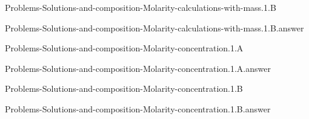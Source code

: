 \documentclass[main.tex]{subfiles}
\newcommand\chapterlabel{}
\begin{document}
\renewcommand\chapterlabel{Ch-electrolytes}
\begin{question}[ID=\the\value{numA}]
{Problems-Solutions-and-composition-Molarity-calculations-with-mass.1.B}
\end{question}
   \begin{Form}
   \TextField[multiline,backgroundcolor=gray!20,borderwidth=0,width=0.43\textwidth  ,height=115pt, name=\the\value{numA}]  { }\end{Form}
\begin{solution}
{Problems-Solutions-and-composition-Molarity-calculations-with-mass.1.B.answer}
\hspace{0.1cm}
\end{solution}


\renewcommand\chapterlabel{Ch-electrolytes}
\begin{question}[ID=\the\value{numA}]
{Problems-Solutions-and-composition-Molarity-concentration.1.A}
\end{question}
   \begin{Form}
   \TextField[multiline,backgroundcolor=gray!20,borderwidth=0,width=0.43\textwidth  ,height=115pt, name=\the\value{numA}]  { }\end{Form}
\begin{solution}
{Problems-Solutions-and-composition-Molarity-concentration.1.A.answer}
\hspace{0.1cm}
\end{solution}


\renewcommand\chapterlabel{Ch-electrolytes}
\begin{question}[ID=\the\value{numA}]
{Problems-Solutions-and-composition-Molarity-concentration.1.B}
\end{question}
   \begin{Form}
   \TextField[multiline,backgroundcolor=gray!20,borderwidth=0,width=0.43\textwidth  ,height=115pt, name=\the\value{numA}]  { }\end{Form}
\begin{solution}
{Problems-Solutions-and-composition-Molarity-concentration.1.B.answer}
\hspace{0.1cm}
\end{solution}
\end{document}
